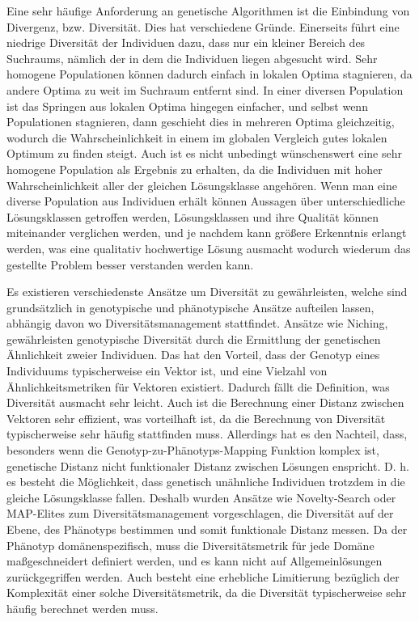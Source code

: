 Eine sehr häufige Anforderung an genetische Algorithmen ist die Einbindung von Divergenz, bzw. Diversität.
Dies hat verschiedene Gründe.
Einerseits führt eine niedrige Diversität der Individuen dazu, dass nur ein kleiner Bereich des Suchraums, nämlich der in dem die Individuen liegen abgesucht wird.
Sehr homogene Populationen können dadurch einfach in lokalen Optima stagnieren, da andere Optima zu weit im Suchraum entfernt sind.
In einer diversen Population ist das Springen aus lokalen Optima hingegen einfacher, und selbst wenn Populationen stagnieren, dann geschieht dies in mehreren Optima gleichzeitig, wodurch die Wahrscheinlichkeit in einem im globalen Vergleich gutes lokalen Optimum zu finden steigt.
Auch ist es nicht unbedingt wünschenswert eine sehr homogene Population als Ergebnis zu erhalten, da die Individuen mit hoher Wahrscheinlichkeit aller der gleichen Lösungsklasse angehören.
Wenn man eine diverse Population aus Individuen erhält können Aussagen über unterschiedliche Lösungsklassen getroffen werden, Lösungsklassen und ihre Qualität können miteinander verglichen werden, und je nachdem kann größere Erkenntnis erlangt werden, was eine qualitativ hochwertige Lösung ausmacht wodurch wiederum das gestellte Problem besser verstanden werden kann.

Es existieren verschiedenste Ansätze um Diversität zu gewährleisten, welche sind grundsätzlich in genotypische und phänotypische Ansätze aufteilen lassen, abhängig davon wo Diversitätsmanagement stattfindet.
Ansätze wie Niching, gewährleisten genotypische Diversität durch die Ermittlung der genetischen Ähnlichkeit zweier Individuen.
Das hat den Vorteil, dass der Genotyp eines Individuums typischerweise ein Vektor ist, und eine Vielzahl von Ähnlichkeitsmetriken für Vektoren existiert.
Dadurch fällt die Definition, was Diversität ausmacht sehr leicht.
Auch ist die Berechnung einer Distanz zwischen Vektoren sehr effizient, was vorteilhaft ist, da die Berechnung von Diversität typischerweise sehr häufig stattfinden muss.
Allerdings hat es den Nachteil, dass, besonders wenn die Genotyp-zu-Phänotyps-Mapping Funktion komplex ist, genetische Distanz nicht funktionaler Distanz zwischen Lösungen enspricht.
D. h. es besteht die Möglichkeit, dass genetisch unähnliche Individuen trotzdem in die gleiche Lösungsklasse fallen.
Deshalb wurden Ansätze wie Novelty-Search oder MAP-Elites\cite{Mouret.4202015} zum Diversitätsmanagement vorgeschlagen, die Diversität auf der Ebene, des Phänotyps bestimmen und somit funktionale Distanz messen.
Da der Phänotyp domänenspezifisch,  muss die Diversitätsmetrik für jede Domäne maßgeschneidert definiert werden, und es kann nicht auf Allgemeinlösungen zurückgegriffen werden.
Auch besteht eine erhebliche Limitierung bezüglich der Komplexität einer solche Diversitätsmetrik, da die Diversität typischerweise sehr häufig berechnet werden muss.

